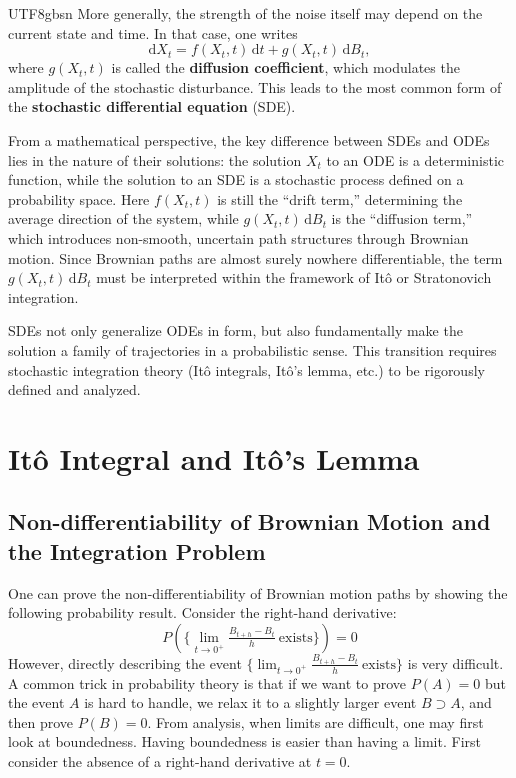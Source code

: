 \documentclass{article}
\begin{document}
\begin{CJK*}{UTF8}{gbsn}
More generally, the strength of the noise itself may depend on the current state and time. In that case, one writes
\[
  \mathrm{d}X_t = f(X_t,t)\,\mathrm{d}t + g(X_t,t)\,\mathrm{d}B_t,
\]
where $g(X_t,t)$ is called the \textbf{diffusion coefficient}, which modulates the amplitude of the stochastic disturbance. This leads to the most common form of the \textbf{stochastic differential equation} (SDE).

\medskip
From a mathematical perspective, the key difference between SDEs and ODEs lies in the nature of their solutions: the solution $X_t$ to an ODE is a deterministic function, while the solution to an SDE is a stochastic process defined on a probability space. Here $f(X_t,t)$ is still the “drift term,” determining the average direction of the system, while $g(X_t,t)\,\mathrm{d}B_t$ is the “diffusion term,” which introduces non-smooth, uncertain path structures through Brownian motion. Since Brownian paths are almost surely nowhere differentiable, the term $g(X_t,t)\,\mathrm{d}B_t$ must be interpreted within the framework of Itô or Stratonovich integration.

SDEs not only generalize ODEs in form, but also fundamentally make the solution a family of trajectories in a probabilistic sense. This transition requires stochastic integration theory (Itô integrals, Itô’s lemma, etc.) to be rigorously defined and analyzed.

\section{Itô Integral and Itô’s Lemma}
\subsection{Non-differentiability of Brownian Motion and the Integration Problem}
One can prove the non-differentiability of Brownian motion paths by showing the following probability result. Consider the right-hand derivative:
$$
P(\{\lim_{t\to0^+} \tfrac{B_{t+h}-B_t}{h}\ \text{exists}\})=0
$$
However, directly describing the event $\{\lim_{t\to0^+} \tfrac{B_{t+h}-B_t}{h}\ \text{exists}\}$ is very difficult.  
A common trick in probability theory is that if we want to prove $P(A)=0$ but the event $A$ is hard to handle, we relax it to a slightly larger event $B\supset A$, and then prove $P(B)=0$.  
From analysis, when limits are difficult, one may first look at boundedness. Having boundedness is easier than having a limit. {First consider the absence of a right-hand derivative at $t=0$.}


\end{CJK*}
\end{document}

